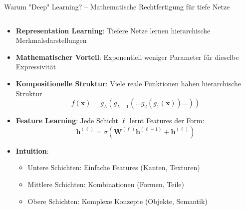 \documentclass[aspectratio=1610, xcolor=dvipsnames, 9pt]{beamer}
\begin{document}
\begin{frame}{Warum "Deep" Learning? -- Mathematische Rechtfertigung für tiefe Netze}
  \begin{columns}
    \begin{column}{1\textwidth}
      \begin{itemize}
        \item \textbf{Representation Learning}: Tiefere Netze lernen hierarchische Merkmalsdarstellungen
        \item \textbf{Mathematischer Vorteil}: Exponentiell weniger Parameter für dieselbe Expressivität
        \item \textbf{Kompositionelle Struktur}: Viele reale Funktionen haben hierarchische Struktur
        \begin{equation}
          f(\mathbf{x}) = g_L(g_{L-1}(...g_2(g_1(\mathbf{x}))...))
        \end{equation}
        \item \textbf{Feature Learning}: Jede Schicht $\ell$ lernt Features der Form:
        \begin{equation}
          \mathbf{h}^{(\ell)} = \sigma(\mathbf{W}^{(\ell)} \mathbf{h}^{(\ell-1)} + \mathbf{b}^{(\ell)})
        \end{equation}
        \item \textbf{Intuition}: 
        \begin{itemize}
          \item Untere Schichten: Einfache Features (Kanten, Texturen)
          \item Mittlere Schichten: Kombinationen (Formen, Teile)
          \item Obere Schichten: Komplexe Konzepte (Objekte, Semantik)
        \end{itemize}
      \end{itemize}
    \end{column}
  \end{columns}
\end{frame}
\end{document}
